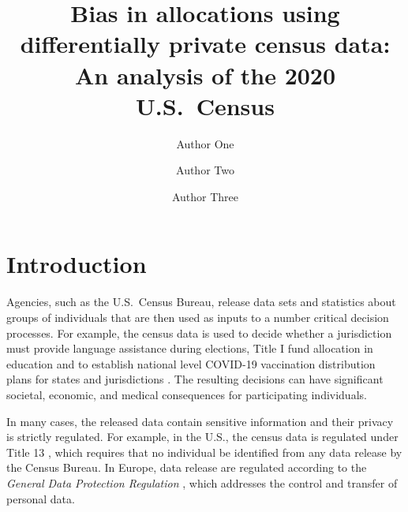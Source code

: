\documentclass[9pt,twocolumn,twoside,lineno]{pnas-new}
\title{Bias in allocations using differentially private census data: An analysis of the 2020 U.S.~Census}
\author[a,c,1]{Author One}
\author[b,1,2]{Author Two}
\author[a]{Author Three}
\affil[a]{Affiliation One}
\affil[b]{Affiliation Two}
\affil[c]{Affiliation Three}
\begin{document}
\maketitle
\thispagestyle{firststyle}




\section*{Introduction}

Agencies, such as the U.S.~Census Bureau, release data sets and
statistics about groups of individuals that are then used as inputs to
a number critical decision processes.  For example, the census data is
used to decide whether a jurisdiction must provide language assistance
during elections, Title I fund allocation in education \cite{pujol:20}
and to establish national level COVID-19 vaccination distribution plans 
for states and jurisdictions \cite{covid}.
The resulting decisions can have significant societal, economic, and medical 
consequences for participating individuals. 

In many cases, the released data
contain sensitive information and their privacy is strictly regulated.
For example, in the U.S., the census data is regulated under Title 13
\cite{title13}, which requires that no individual be identified from
any data release by the Census Bureau. In Europe, data release are
regulated according to the \emph{General Data Protection Regulation}
\cite{GDPR}, which addresses the control and transfer of personal data.
\end{document}
